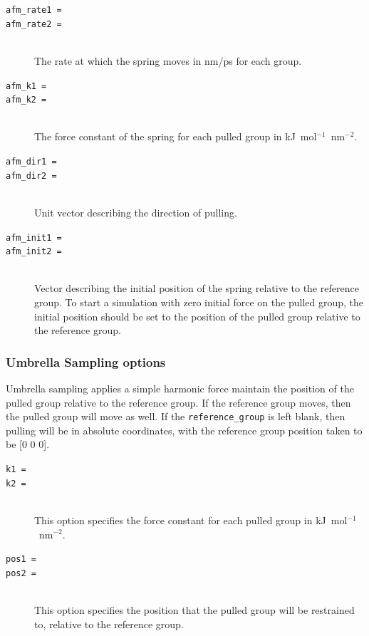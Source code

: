 \begin{description}

\item[\tt afm\_rate1                  = ]
\item[\tt afm\_rate2                  = ]\mbox{}\\
The rate at which the spring moves in nm/ps for each group.

\item[\tt afm\_k1                  = ]
\item[\tt afm\_k2                  = ]\mbox{}\\
The force constant of the spring for each pulled group in
kJ~mol$^{-1}$~nm$^{-2}$.

\item[\tt afm\_dir1                  = ]
\item[\tt afm\_dir2                  = ]\mbox{}\\
Unit vector describing the direction of pulling.

\item[\tt afm\_init1                  = ]
\item[\tt afm\_init2                  = ]\mbox{}\\
Vector describing the initial position of the spring
relative to the reference group. To start a simulation with zero 
initial force on the pulled group, the initial position should be set
to the position of the pulled group relative to the reference
group.

\end{description}

\subsubsection{Umbrella Sampling options}

Umbrella sampling applies a simple harmonic force maintain the position
of the pulled group relative to the reference group. If the reference group 
moves, then the pulled group will move as well. If the
{\tt reference\_group} is left blank, then pulling will be
in absolute coordinates, with the reference group position
taken to be [0 0 0].

\begin{description}

\item[\tt k1                          = ]
\item[\tt k2                          = ]\mbox{}\\
This option specifies the force constant for each pulled group in 
kJ~mol$^{-1}$~nm$^{-2}$.


\item[\tt pos1                        = ]
\item[\tt pos2                        = ]\mbox{}\\
This option specifies the position that the pulled group will be restrained to, relative
to the reference group.
\end{description}

